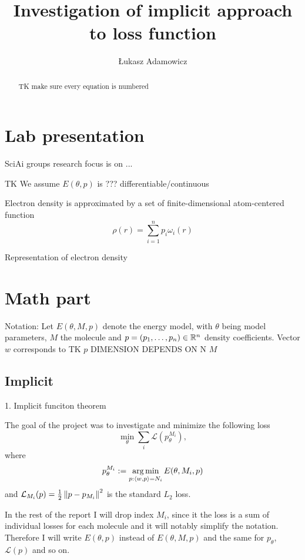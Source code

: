 \documentclass[a4paper,10pt]{report}
\title{Investigation of implicit approach to loss function}
\author{Łukasz Adamowicz}
\begin{document}
\maketitle

\begin{abstract}
TK make sure every equation is numbered
\end{abstract}



\section{ Lab presentation}
SciAi groups research focus is on ...

TK
We assume $E(\theta, p)$ is ??? differentiable/continuous

Electron density is approximated by a set of finite-dimensional  atom-centered function
\begin{equation}
 \rho(r) = \sum_{i=1}^n p_i \omega_i(r)
\end{equation}


Representation of electron density
 \section{Math part}
Notation: Let $E(\theta, M ,p)$ denote the energy model, with $\theta$ being model parameters, $M$ the molecule and $p=(p_1, \ldots ,p_n )\in \mathbb{R}^n$ density coefficients. Vector $w$ corresponds to
TK $p$ DIMENSION DEPENDS ON N $M$

 \subsection{Implicit}
1. Implicit funciton theorem

The goal of the project was to investigate and minimize the following loss
\begin{equation}
 \min_\theta \sum_i \mathcal{L}(p_{\theta}^{M_i}),
\end{equation}
where
\begin{equation}
  p_\theta^{M_i}:=\operatorname*{arg\,min}_{p : \langle w, p \rangle=N_i} E(\theta,M_i,p)
\end{equation}
and $\mathcal{L}_{M_i}(p) = \frac{1}{2}\left\|p-p_{M_i}\right\|^2$ is the standard $L_2$ loss.

In the rest of the report I will drop index $M_i$, since it the loss is a sum of individual losses for each molecule and it will notably simplify the notation.
Therefore I will write $E(\theta,p)$ instead of $E(\theta,M,p)$ and the same for $p_\theta$, $\mathcal{L}(p)$ and so on.
\end{document}
